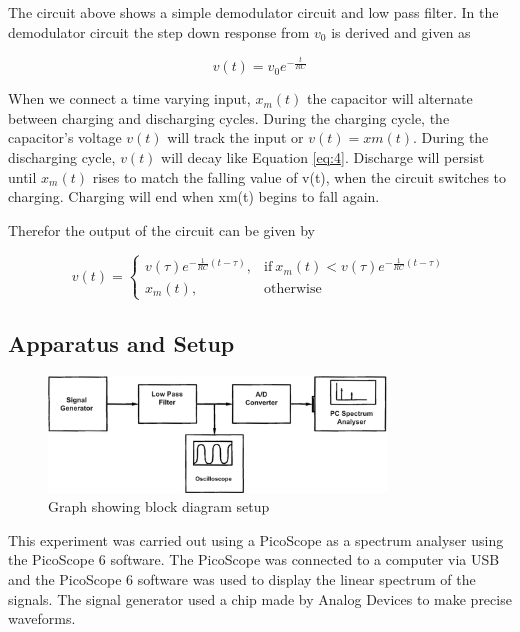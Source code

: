 \documentclass[12pt]{article}
\begin{document}
The circuit above shows a simple demodulator circuit and low pass filter.
In the demodulator circuit the step down response from $v_0$ is derived and given as

\begin{equation}
    v(t) = v_0 e^{-\frac{t}{RC}}
    \label{eq:7}
\end{equation}

When we connect a time varying input, $x_m(t)$ the capacitor will alternate
between charging and discharging cycles. During the charging cycle, the capacitor's voltage $v(t)$ will
track the input or $v(t) = xm(t)$. During the discharging cycle, $v(t)$ will decay like Equation \ref{eq:4}. Discharge
will persist until $x_m(t)$ rises to match the falling value of v(t), when the circuit switches to charging.
Charging will end when xm(t) begins to fall again.

Therefor the output of the circuit can be given by

\begin{equation}
    v(t) = 
    \begin{cases}
        v(\tau)e^{-\frac{1}{RC}(t-\tau)}, & \text{if} \ x_m(t) < v(\tau)e^{-\frac{1}{RC}(t-\tau)} \\
        x_m(t), & \text{otherwise}
    \end{cases}
    \label{eq:8}
\end{equation}

\subsection{Apparatus and Setup}

\begin{figure}[h]
    \centering
    \includegraphics[width=0.8\textwidth]{setup_diagram.png}
    \caption{Graph showing block diagram setup}
    \label{fig:setup}
\end{figure}

This experiment was carried out using a PicoScope as a spectrum analyser using the PicoScope 6 software. The PicoScope was connected to a computer via USB and the PicoScope 6 software was used to display the linear spectrum of the signals.
The signal generator used a chip made by Analog Devices to make precise waveforms.
\end{document}
